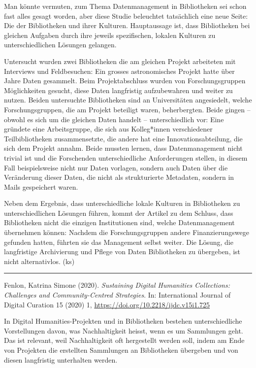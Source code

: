 \documentclass[a4paper,
fontsize=11pt,
oneside,
numbers=noperiodatend,
parskip=half-,
bibliography=totoc,
final
]{scrartcl}
\begin{document}
Man könnte vermuten, zum Thema Datenmanagement in Bibliotheken sei schon
fast alles gesagt worden, aber diese Studie beleuchtet tatsächlich eine
neue Seite: Die der Bibliotheken und ihrer Kulturen. Hauptaussage ist,
dass Bibliotheken bei gleichen Aufgaben durch ihre jeweils spezifischen,
lokalen Kulturen zu unterschiedlichen Lösungen gelangen.

Untersucht wurden zwei Bibliotheken die am gleichen Projekt arbeiteten
mit Interviews und Feldbesuchen: Ein grosses astronomisches Projekt
hatte über Jahre Daten gesammelt. Beim Projektabschluss wurden von
Forschungsgruppen Möglichkeiten gesucht, diese Daten langfristig
aufzubewahren und weiter zu nutzen. Beiden untersuchte Bibliotheken sind
an Universitäten angesiedelt, welche Forschungsgruppen, die am Projekt
beteiligt waren, beherbergten. Beide gingen -- obwohl es sich um die
gleichen Daten handelt -- unterschiedlich vor: Eine gründete eine
Arbeitsgruppe, die sich aus Kolleg*innen verschiedener Teilbibliotheken
zusammensetzte, die andere hat eine Innovationsabteilung, die sich dem
Projekt annahm. Beide mussten lernen, dass Datenmanagement nicht trivial
ist und die Forschenden unterschiedliche Anforderungen stellen, in
diesem Fall beispielsweise nicht nur Daten vorlagen, sondern auch Daten
über die Veränderung dieser Daten, die nicht als strukturierte
Metadaten, sondern in Mails gespeichert waren.

Neben dem Ergebnis, dass unterschiedliche lokale Kulturen in
Bibliotheken zu unterschiedlichen Lösungen führen, kommt der Artikel zu
dem Schluss, dass Bibliotheken nicht die einzigen Institutionen sind,
welche Datenmanagement übernehmen können: Nachdem die Forschungsgruppen
andere Finanzierungswege gefunden hatten, führten sie das Management
selbst weiter. Die Lösung, die langfristige Archivierung und Pflege von
Daten Bibliotheken zu übergeben, ist nicht alternativlos. (ks)

\begin{center}\rule{0.5\linewidth}{0.5pt}\end{center}

Fenlon, Katrina Simone (2020). \emph{Sustaining Digital Humanities
Collections: Challenges and Community-Centred Strategies}. In:
International Journal of Digital Curation 15 (2020) 1,
\url{https://doi.org/10.2218/ijdc.v15i1.725}

In Digital Humanities-Projekten und in Bibliotheken bestehen
unterschiedliche Vorstellungen davon, was Nachhaltigkeit heisst, wenn es
um Sammlungen geht. Das ist relevant, weil Nachhaltigkeit oft
hergestellt werden soll, indem am Ende von Projekten die erstellten
Sammlungen an Bibliotheken übergeben und von diesen langfristig
unterhalten werden.
\end{document}

